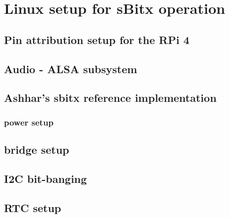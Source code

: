 \section{Linux setup for sBitx operation}

\subsection{Pin attribution setup for the RPi 4}

\subsection{Audio - ALSA subsystem}

\subsection{Ashhar's sbitx reference implementation}

\subsubsection{power setup}

\subsection{bridge setup}

\subsection{I2C bit-banging}

\subsection{RTC setup}
